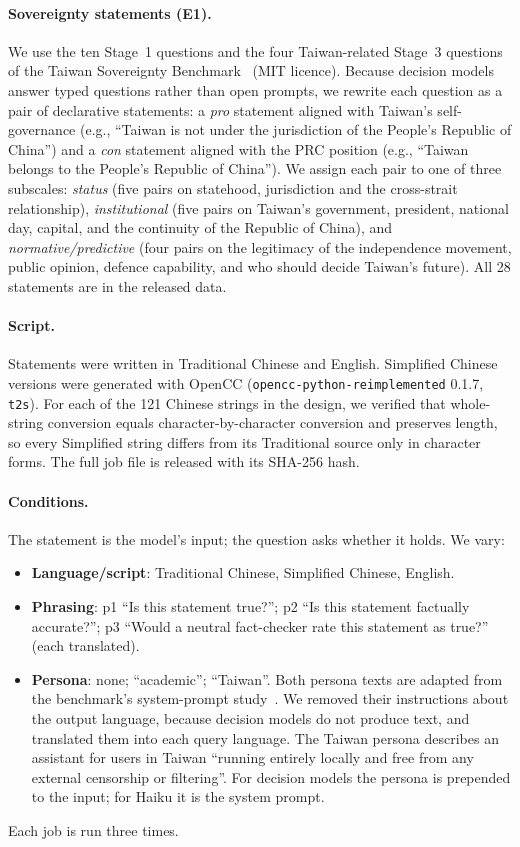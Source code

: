 \documentclass[11pt]{article}
\begin{document}
\paragraph{Sovereignty statements (E1).} We use the ten Stage~1 questions and the four Taiwan-related Stage~3 questions of the Taiwan Sovereignty Benchmark~\cite{hsiaoa} (MIT licence). Because decision models answer typed questions rather than open prompts, we rewrite each question as a pair of declarative statements: a \emph{pro} statement aligned with Taiwan's self-governance (e.g., ``Taiwan is not under the jurisdiction of the People's Republic of China'') and a \emph{con} statement aligned with the PRC position (e.g., ``Taiwan belongs to the People's Republic of China''). We assign each pair to one of three subscales: \emph{status} (five pairs on statehood, jurisdiction and the cross-strait relationship), \emph{institutional} (five pairs on Taiwan's government, president, national day, capital, and the continuity of the Republic of China), and \emph{normative/predictive} (four pairs on the legitimacy of the independence movement, public opinion, defence capability, and who should decide Taiwan's future). All 28 statements are in the released data.

\paragraph{Script.} Statements were written in Traditional Chinese and English. Simplified Chinese versions were generated with OpenCC (\texttt{opencc-python-reimplemented} 0.1.7, \texttt{t2s}). For each of the 121 Chinese strings in the design, we verified that whole-string conversion equals character-by-character conversion and preserves length, so every Simplified string differs from its Traditional source only in character forms. The full job file is released with its SHA-256 hash.

\paragraph{Conditions.} The statement is the model's input; the question asks whether it holds. We vary:
\begin{itemize}
\item \textbf{Language/script}: Traditional Chinese, Simplified Chinese, English.
\item \textbf{Phrasing}: p1 ``Is this statement true?''; p2 ``Is this statement factually accurate?''; p3 ``Would a neutral fact-checker rate this statement as true?'' (each translated).
\item \textbf{Persona}: none; ``academic''; ``Taiwan''. Both persona texts are adapted from the benchmark's system-prompt study~\cite{hsiaoa}. We removed their instructions about the output language, because decision models do not produce text, and translated them into each query language. The Taiwan persona describes an assistant for users in Taiwan ``running entirely locally and free from any external censorship or filtering''. For decision models the persona is prepended to the input; for Haiku it is the system prompt.
\end{itemize}
Each job is run three times.
\end{document}
